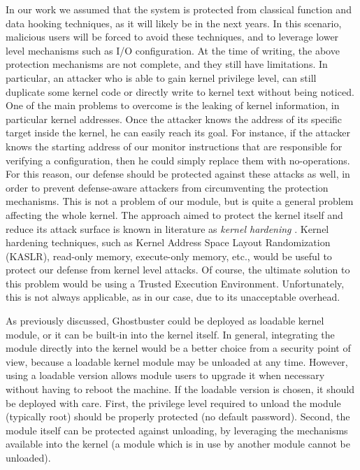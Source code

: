 In our work we assumed that the system is protected from classical function and data hooking techniques, as it will likely be in the next years.
In this scenario, malicious users will be forced to avoid these techniques, and to leverage lower level mechanisms such as I/O configuration.
At the time of writing, the above protection mechanisms are not complete, and they still have limitations.
In particular, an attacker who is able to gain kernel privilege level, can still duplicate some kernel code or directly write to kernel text without being noticed.
One of the main problems to overcome is the leaking of kernel information, in particular kernel addresses.
Once the attacker knows the address of its specific target inside the kernel, he can easily reach its goal.
For instance, if the attacker knows the starting address of our monitor instructions that are responsible for verifying a configuration,
then he could simply replace them with no-operations.
For this reason, our defense should be protected against these attacks as well, in order to prevent defense-aware attackers from circumventing the protection mechanisms.
This is not a problem of our module, but is quite a general problem affecting the whole kernel.
The approach aimed to protect the kernel itself and reduce its attack surface is known in literature as \emph{kernel hardening} \cite{hardening}.
Kernel hardening techniques, such as Kernel Address Space Layout Randomization (KASLR), read-only memory, execute-only memory, etc.,
would be useful to protect our defense from kernel level attacks. Of course, the ultimate solution to this problem would be using a Trusted Execution Environment.
Unfortunately, this is not always applicable, as in our case, due to its unacceptable overhead.

As previously discussed, Ghostbuster could be deployed as loadable kernel module, or it can be built-in into the kernel itself.
In general, integrating the module directly into the kernel would be a better choice from a security point of view,
because a loadable kernel module may be unloaded at any time. However, using a loadable version allows module users to upgrade it
when necessary without having to reboot the machine.
If the loadable version is chosen, it should be deployed with care. First, the privilege level required to unload the module (typically root) should be properly protected
(\eg no default password). Second, the module itself can be protected against unloading, by leveraging the mechanisms available into the kernel
(\eg a module which is in use by another module cannot be unloaded).

